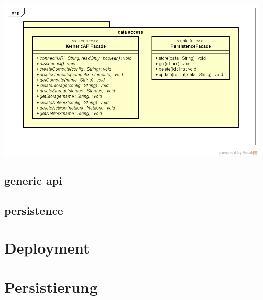 \documentclass[11pt]{scrartcl}
\begin{document}
\begin{center}
\includegraphics[scale=0.5]{Klassenstruktur-dataaccess}
\end{center}


\subsection{generic api}

\subsection{persistence}

\section{Deployment}

\section{Persistierung}
\end{document}
